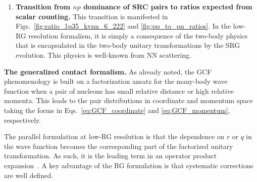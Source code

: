 \documentclass[10pt,aps,prc,floatfix,twocolumn,nofootinbib]{revtex4-1}
\begin{document}
\begin{enumerate}
  \item \textbf{Transition from $np$ dominance of SRC pairs to ratios expected from scalar counting.}
   This transition is manifested in Figs.~\ref{fig:ratio_1p35_kvnn_6_222} and \ref{fig:pp_to_pn_ratios}.
   In the low-RG resolution formalism, it is simply a consequence of the two-body physics that is encapsulated in the two-body unitary transformations by the SRG evolution.
   This physics is well-known from NN scattering.

\end{enumerate}

\textbf{The generalized contact formalism.}
%
As already noted, the GCF phenomenology is built on
a factorization ansatz for the many-body wave function  when a pair of nucleons has small relative distance or high relative momenta.
This leads to the pair distributions in coordinate and momentum space taking the forms in Eqs.~\eqref{eq:GCF_coordinate} and \eqref{eq:GCF_momentum}, respectively.

The parallel formulation at low-RG resolution is that the dependence on $r$ or $q$ in the wave function becomes the corresponding part of the factorized unitary transformation.
As such, it is the leading term in an operator product expansion~\cite{Anderson:2010aq,Bogner:2012zm,Chen:2016bde,Tropiano:2020zwb}.
A key advantage of the RG formulation is that systematic corrections are well defined.
\end{document}
